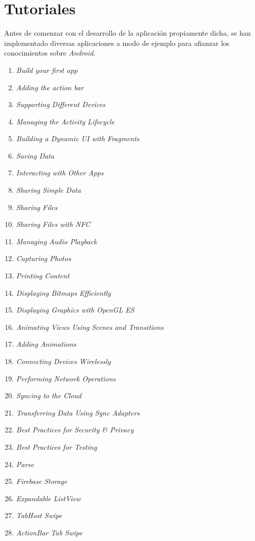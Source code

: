 	
	
	\section{Tutoriales}
	
	Antes de comenzar con el desarrollo de la aplicación propiamente dicha, se han implementado diversas aplicaciones a modo de ejemplo para afianzar los conocimientos sobre {\it Android}.
	
	\begin{enumerate}
		\setlength{\itemsep}{1pt}
		\setlength{\parskip}{0pt}
		\setlength{\parsep}{0pt}
		\item {\it Build your first app} \cite{29:firstapp:online}
		\item {\it Adding the action bar}
		\item {\it Supporting Different Devices} \label{tut:3}
		\item {\it Managing the Activity Lifecycle}
		\item {\it Building a Dynamic UI with Fragments} \label{tut:5}
		\item {\it Saving Data}
		\item {\it Interacting with Other Apps}
		\item {\it Sharing Simple Data}
		\item {\it Sharing Files}
		\item {\it Sharing Files with NFC}
		\item {\it Managing Audio Playback}
		\item {\it Capturing Photos}
		\item {\it Printing Content}
		\item {\it Displaying Bitmaps Efficiently}
		\item {\it Displaying Graphics with OpenGL ES}
		\item {\it Animating Views Using Scenes and Transitions}
		\item {\it Adding Animations} \label{tut:17}
		\item {\it Connecting Devices Wirelessly}
		\item {\it Performing Network Operations}
		\item {\it Syncing to the Cloud}
		\item {\it Transferring Data Using Sync Adapters}
		\item {\it Best Practices for Security \& Privacy}
		\item {\it Best Practices for Testing}
		\item {\it Parse}
		\item {\it Firebase Storage} \label{tut:25}
		\item {\it Expandable ListView} \label{tut:26}
		\item {\it TabHost Swipe} \cite{55:tabhostswipe:online} \label{tut:27}
		\item {\it ActionBar Tab Swipe} \label{tut:28}
	\end{enumerate}
	
